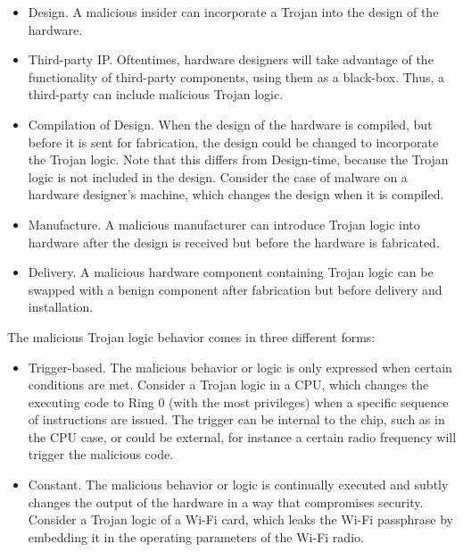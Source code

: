 \documentclass[11pt,letterpaper]{article}
\begin{document}
\begin{itemize}

\item Design. A malicious insider can incorporate a Trojan into the
  design of the hardware.

\item Third-party IP. Oftentimes, hardware designers will take
  advantage of the functionality of third-party components, using them
  as a black-box. Thus, a third-party can include malicious Trojan
  logic.

\item Compilation of Design. When the design of the hardware is
  compiled, but before it is sent for fabrication, the design could be
  changed to incorporate the Trojan logic. Note that this differs from
  Design-time, because the Trojan logic is not included in the design.
  Consider the case of malware on a hardware designer's machine, which
  changes the design when it is compiled.

\item Manufacture. A malicious manufacturer can introduce Trojan logic
  into hardware after the design is received but before the hardware
  is fabricated.

\item Delivery. A malicious hardware component containing Trojan logic
  can be swapped with a benign component after fabrication but before
  delivery and installation.
  
\end{itemize}

The malicious Trojan logic behavior comes in three different forms:

\begin{itemize}

\item Trigger-based. The malicious behavior or logic is only expressed
  when certain conditions are met. Consider a Trojan logic in a CPU,
  which changes the executing code to Ring 0 (with the most
  privileges) when a specific sequence of instructions are issued. The
  trigger can be internal to the chip, such as in the CPU case, or
  could be external, for instance a certain radio frequency will
  trigger the malicious code.

\item Constant. The malicious behavior or logic is continually
  executed and subtly changes the output of the hardware in a way that
  compromises security. Consider a Trojan logic of a Wi-Fi card, which
  leaks the Wi-Fi passphrase by embedding it in the operating
  parameters of the Wi-Fi radio.
  
\end{itemize}
\end{document}
